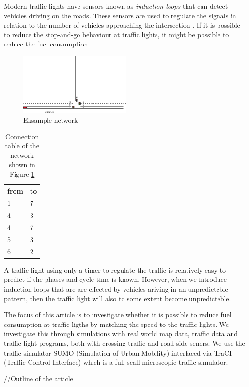Modern traffic lights have sensors known as \textit{induction loops} that can detect vehicles driving on the roads.
These sensors are used to regulate the signals in relation to the number of vehicles approaching the intersection \cite{Vejdir}. %
If it is possible to reduce the stop-and-go behaviour at traffic lights, it might be possible to reduce the fuel consumption.



\begin{figure}[htb]
\centering
\includegraphics[width=0.5\textwidth]{images/introNetwork.png}
\caption{Eksample network}
\label{fig:Introduction:network}
\end{figure}

\begin{table}[h]
\centering
\begin{tabular}{|l|l|}
\hline
from & to \\ \hline
1 & 7 \\ \hline
4 & 3 \\ \hline
4 & 7 \\ \hline
5 & 3 \\ \hline
6 & 2 \\ \hline
\end{tabular}
\caption{Connection table of the network shown in Figure \ref{fig:Introduction:network} }
\label{tab:Introduction:connectionTable}
\end{table}


A traffic light using only a timer to regulate the traffic is relatively easy to predict if the phases and cycle time is known. 
However, when we introduce induction loops that are are effected by vehicles ariving in an unpredicteble pattern, then the traffic light will also to some extent become unpredicteble. 

The focus of this article is to investigate whether it is possible to reduce fuel consumption at traffic ligths by matching the speed to the traffic lights. We investigate this through simulations with real world map data, traffic data and traffic light programs, both with crossing traffic and road-side senors. %
We use the traffic simulator SUMO (Simulation of Urban Mobility)\cite{sumo} interfaced via TraCI (Traffic Control Interface)\cite{traci} which is a full scall microscopic traffic simulator.

//Outline of the article





